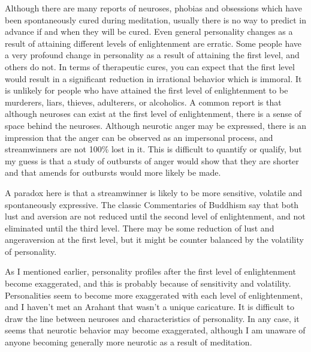 \documentclass[a5paper,10pt,english]{book}
\begin{document}
\sphinxAtStartPar
Although there are many reports of neuroses, phobias and obsessions
which have been spontaneously cured during meditation, usually there is
no way to predict in advance if and when they will be cured. Even
general personality changes as a result of attaining different levels of
enlightenment are erratic. Some people have a very profound change in
personality as a result of attaining the first level, and others do not.
In terms of therapeutic cures, you can expect that the first level would
result in a significant reduction in irrational behavior which is
immoral. It is unlikely for people who have attained the first level of
enlightenment to be murderers, liars, thieves, adulterers, or
alcoholics. A common report is that although neuroses can exist at the
first level of enlightenment, there is a sense of space behind the
neuroses. Although neurotic anger may be expressed, there is an
impression that the anger can be observed as an impersonal process, and
stream\sphinxhyphen{}winners are not 100\% lost in it. This is difficult to quantify or
qualify, but my guess is that a study of outbursts of anger would show
that they are shorter and that amends for outbursts would more likely be
made.

\sphinxAtStartPar
A paradox here is that a stream\sphinxhyphen{}winner is likely to be more sensitive,
volatile and spontaneously expressive. The classic Commentaries of
Buddhism say that both lust and aversion are not reduced until the
second level of enlightenment, and not eliminated until the third level.
There may be some reduction of lust and anger\sphinxhyphen{}aversion at the first
level, but it might be counter balanced by the volatility of
personality.

\sphinxAtStartPar
As I mentioned earlier, personality profiles after the first level of
enlightenment become exaggerated, and this is probably because of
sensitivity and volatility. Personalities seem to become more
exaggerated with each level of enlightenment, and I haven’t met an
Arahant that wasn’t a unique caricature. It is difficult to draw the
line between neuroses and characteristics of personality. In any case,
it seems that neurotic behavior may become exaggerated, although I am
unaware of anyone becoming generally more neurotic as a result of
meditation.
\end{document}
